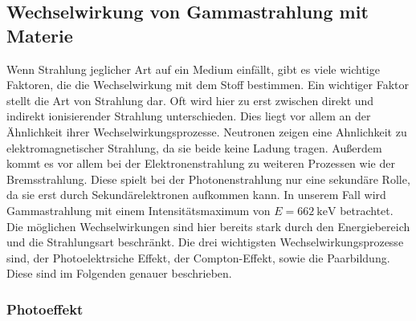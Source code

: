 \subsection{Wechselwirkung von Gammastrahlung mit Materie}
Wenn Strahlung jeglicher Art auf ein Medium einfällt, gibt es viele wichtige Faktoren, die die Wechselwirkung mit dem Stoff bestimmen. 
Ein wichtiger Faktor stellt die Art von Strahlung dar. Oft wird hier zu erst zwischen direkt und indirekt ionisierender Strahlung unterschieden. 
Dies liegt vor allem an der Ähnlichkeit ihrer Wechselwirkungsprozesse. Neutronen zeigen eine Ahnlichkeit zu elektromagnetischer Strahlung, da sie beide keine Ladung tragen. 
Außerdem kommt es vor allem bei der Elektronenstrahlung zu weiteren Prozessen wie der Bremsstrahlung. Diese spielt bei der Photonenstrahlung nur eine sekundäre Rolle, da sie erst durch Sekundärelektronen aufkommen kann. 
In unserem Fall wird Gammastrahlung mit einem Intensitätsmaximum von $E = \SI{662}{\kilo\electronvolt}$ betrachtet. 
Die möglichen Wechselwirkungen sind hier bereits stark durch den Energiebereich und die Strahlungsart beschränkt.
Die drei wichtigsten Wechselwirkungsprozesse sind, der Photoelektrsiche Effekt, der Compton-Effekt, sowie die Paarbildung. Diese sind im Folgenden genauer beschrieben.
\subsubsection{Photoeffekt}

